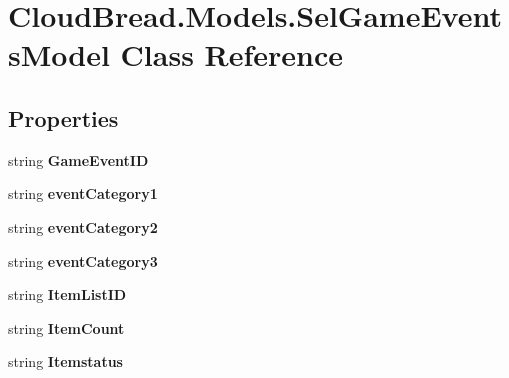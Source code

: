 \hypertarget{a00087}{}\section{Cloud\+Bread.\+Models.\+Sel\+Game\+Events\+Model Class Reference}
\label{a00087}
\subsection*{Properties}
\begin{DoxyCompactItemize}
\item 
string {\bfseries Game\+Event\+ID}\hypertarget{a00087_afc44d469534a97b1be47a88430eed9b0}{}\label{a00087_afc44d469534a97b1be47a88430eed9b0}

\item 
string {\bfseries event\+Category1}\hypertarget{a00087_a60bc46833fa3efadfab285c4e5bd248e}{}\label{a00087_a60bc46833fa3efadfab285c4e5bd248e}

\item 
string {\bfseries event\+Category2}\hypertarget{a00087_aa5cf0431193d03db32c13fbb3ecda113}{}\label{a00087_aa5cf0431193d03db32c13fbb3ecda113}

\item 
string {\bfseries event\+Category3}\hypertarget{a00087_afa61a66532bfa7ad5d9259622ea51d73}{}\label{a00087_afa61a66532bfa7ad5d9259622ea51d73}

\item 
string {\bfseries Item\+List\+ID}\hypertarget{a00087_a901251a4badab5aaab14c05306407c3c}{}\label{a00087_a901251a4badab5aaab14c05306407c3c}

\item 
string {\bfseries Item\+Count}\hypertarget{a00087_ae45f58fc081833acd890de7f7f712059}{}\label{a00087_ae45f58fc081833acd890de7f7f712059}

\item 
string {\bfseries Itemstatus}\hypertarget{a00087_a81f768083a537a06a47a6253c98ad55d}{}\label{a00087_a81f768083a537a06a47a6253c98ad55d}


\end{DoxyCompactItemize}
